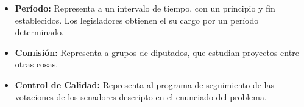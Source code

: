 \begin{itemize}
\item \textbf{Per\'iodo: } Representa a un intervalo de tiempo, con un principio y fin establecidos. Los legisladores obtienen el su cargo por un per\'iodo determinado.

\quad

\item \textbf{Comisi\'on: } Representa a grupos de diputados, que estudian proyectos entre otras cosas.

\quad

\item \textbf{Control de Calidad: } Representa al programa de seguimiento de las votaciones de los senadores descripto en el enunciado del problema.


\end{itemize}